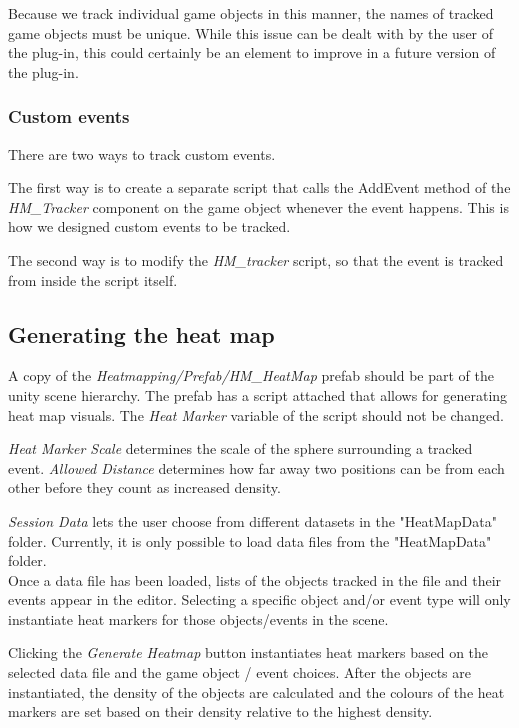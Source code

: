 Because we track individual game objects in this manner, the names of tracked game objects must be unique. While this issue can be dealt with by the user of the plug-in, this could certainly be an element to improve in a future version of the plug-in.

\subsubsection{Custom events}
There are two ways to track custom events. 

The first way is to create a separate script that calls the AddEvent method of the \textit{HM\_Tracker} component on the game object whenever the event happens. This is how we designed custom events to be tracked.

The second way is to modify the \textit{HM\_tracker} script, so that the event is tracked from inside the script itself.

\subsection{Generating the heat map}
\label{HowToUse_Generating}
A copy of the \textit{Heatmapping/Prefab/HM\_HeatMap} prefab should be part of the unity scene hierarchy. The prefab has a script attached that allows for generating heat map visuals. The \textit{Heat Marker} variable of the script should not be changed. 


\textit{Heat Marker Scale} determines the scale of the sphere surrounding a tracked event. \textit{Allowed Distance} determines how far away two positions can be from each other before they count as increased density.

\textit{Session Data} lets the user choose from different datasets in the "HeatMapData" folder. Currently, it is only possible to load data files from the "HeatMapData" folder.
\\Once a data file has been loaded, lists of the objects tracked in the file and their events appear in the editor. Selecting a specific object and/or event type will only instantiate heat markers for those objects/events in the scene.

Clicking the \textit{Generate Heatmap} button instantiates heat markers based on the selected data file and the game object / event choices. After the objects are instantiated, the density of the objects are calculated and the colours of the heat markers are set based on their density relative to the highest density.

